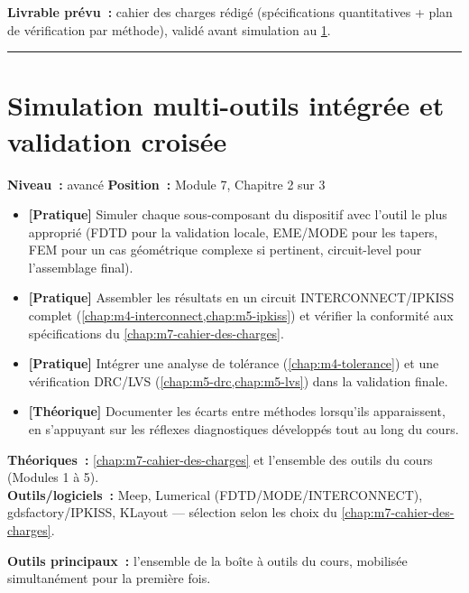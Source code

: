\noindent\textbf{Livrable prévu~:} cahier des charges rédigé (spécifications quantitatives + plan de vérification par méthode), validé avant simulation au \cref{chap:m7-simulation}.

\bigskip\hrule\bigskip

\chapter{Simulation multi-outils intégrée et validation croisée}
\label{chap:m7-simulation}

\noindent\textbf{Niveau~:} avancé \hfill \textbf{Position~:} Module 7, Chapitre 2 sur 3

\begin{objectifs}
\begin{itemize}[leftmargin=1.4em]
  \item \textbf{[Pratique]} Simuler chaque sous-composant du dispositif avec l'outil le plus approprié (FDTD pour la validation locale, EME/MODE pour les tapers, FEM pour un cas géométrique complexe si pertinent, circuit-level pour l'assemblage final).
  \item \textbf{[Pratique]} Assembler les résultats en un circuit INTERCONNECT/IPKISS complet (\cref{chap:m4-interconnect,chap:m5-ipkiss}) et vérifier la conformité aux spécifications du \cref{chap:m7-cahier-des-charges}.
  \item \textbf{[Pratique]} Intégrer une analyse de tolérance (\cref{chap:m4-tolerance}) et une vérification DRC/LVS (\cref{chap:m5-drc,chap:m5-lvs}) dans la validation finale.
  \item \textbf{[Théorique]} Documenter les écarts entre méthodes lorsqu'ils apparaissent, en s'appuyant sur les réflexes diagnostiques développés tout au long du cours.
\end{itemize}
\end{objectifs}

\begin{prerequis}
\textbf{Théoriques~:} \cref{chap:m7-cahier-des-charges} et l'ensemble des outils du cours (Modules 1 à 5).\\
\textbf{Outils/logiciels~:} Meep, Lumerical (FDTD/MODE/INTERCONNECT), gdsfactory/IPKISS, KLayout — sélection selon les choix du \cref{chap:m7-cahier-des-charges}.
\end{prerequis}

\noindent\textbf{Outils principaux~:} l'ensemble de la boîte à outils du cours, mobilisée simultanément pour la première fois.

